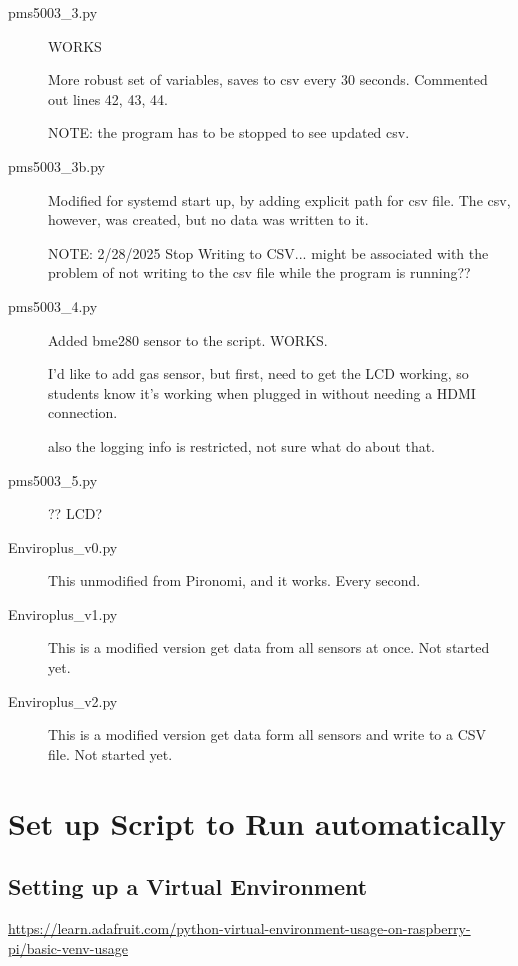 \documentclass{article}
\begin{document}
\begin{description}

\item[pms5003\_3.py] WORKS

More robust set of variables, saves to csv every 30 seconds. Commented out lines 42, 43, 44.

NOTE: the program has to be stopped to see updated csv. 

\item[pms5003\_3b.py] Modified for systemd start up, by adding explicit path for csv file. The csv, however, was created, but no data was written to it.


NOTE: 2/28/2025 Stop Writing to CSV... might be associated with the problem of not writing to the csv file while the program is running??


\item[pms5003\_4.py] Added bme280 sensor to the script. WORKS.

I'd like to add gas sensor, but first, need to get the LCD working, so students know
it's working when plugged in without needing a HDMI connection. 

also the logging info is restricted, not sure what do about that.


\item[pms5003\_5.py] ?? LCD?

\item[Enviroplus\_v0.py] This unmodified from Pironomi, and it works. Every second.
  
  
\item[Enviroplus\_v1.py] This is a modified version get data from all sensors at once. Not started yet.

\item[Enviroplus\_v2.py] This is a modified version get data form all sensors and write to a CSV file. Not started yet.
  

\end{description}


\section{Set up Script to Run automatically}

\subsection{Setting up a Virtual Environment}

\url{https://learn.adafruit.com/python-virtual-environment-usage-on-raspberry-pi/basic-venv-usage}
\end{document}
